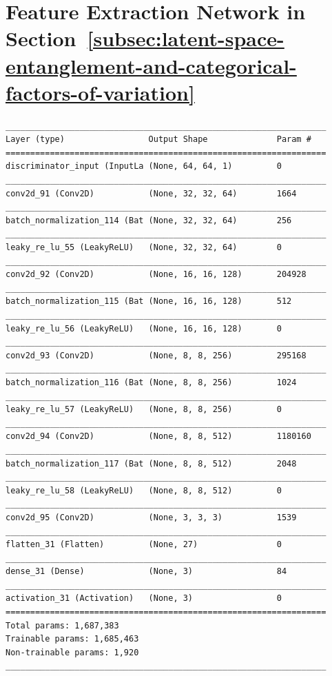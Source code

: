 \documentclass[11pt,a4paper]{article}
\let\oldsection\section
\renewcommand\section{\clearpage\oldsection}
\begin{document}
\section{Feature Extraction Network in Section~\ref{subsec:latent-space-entanglement-and-categorical-factors-of-variation}}\label{sec:appendix_feature_extraction_network_ppl_dsprites}
\begin{lstlisting}[caption={Feature extraction network for \ac{PPL} computation.},captionpos=b]
_________________________________________________________________
Layer (type)                 Output Shape              Param #
=================================================================
discriminator_input (InputLa (None, 64, 64, 1)         0
_________________________________________________________________
conv2d_91 (Conv2D)           (None, 32, 32, 64)        1664
_________________________________________________________________
batch_normalization_114 (Bat (None, 32, 32, 64)        256
_________________________________________________________________
leaky_re_lu_55 (LeakyReLU)   (None, 32, 32, 64)        0
_________________________________________________________________
conv2d_92 (Conv2D)           (None, 16, 16, 128)       204928
_________________________________________________________________
batch_normalization_115 (Bat (None, 16, 16, 128)       512
_________________________________________________________________
leaky_re_lu_56 (LeakyReLU)   (None, 16, 16, 128)       0
_________________________________________________________________
conv2d_93 (Conv2D)           (None, 8, 8, 256)         295168
_________________________________________________________________
batch_normalization_116 (Bat (None, 8, 8, 256)         1024
_________________________________________________________________
leaky_re_lu_57 (LeakyReLU)   (None, 8, 8, 256)         0
_________________________________________________________________
conv2d_94 (Conv2D)           (None, 8, 8, 512)         1180160
_________________________________________________________________
batch_normalization_117 (Bat (None, 8, 8, 512)         2048
_________________________________________________________________
leaky_re_lu_58 (LeakyReLU)   (None, 8, 8, 512)         0
_________________________________________________________________
conv2d_95 (Conv2D)           (None, 3, 3, 3)           1539
_________________________________________________________________
flatten_31 (Flatten)         (None, 27)                0
_________________________________________________________________
dense_31 (Dense)             (None, 3)                 84
_________________________________________________________________
activation_31 (Activation)   (None, 3)                 0
=================================================================
Total params: 1,687,383
Trainable params: 1,685,463
Non-trainable params: 1,920
_________________________________________________________________
\end{lstlisting}
\end{document}
